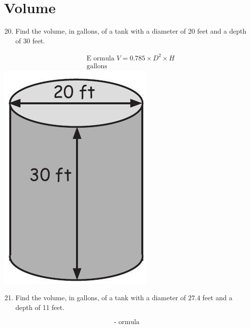 \documentclass[10pt]{article}
\begin{document}
\section{Volume}
\begin{enumerate}
  \setcounter{enumi}{19}
  \item Find the volume, in gallons, of a tank with a diameter of 20 feet and a depth of 30 feet.
\end{enumerate}
$$
\begin{aligned}
& \text { E ormula } V=0.785 \times D^{2} \times H \\
& \text { gallons }
\end{aligned}
$$
\includegraphics[max width=\textwidth]{2022_09_16_4d34b76b97ee13a67df7g-22}

\begin{enumerate}
  \setcounter{enumi}{20}
  \item Find the volume, in gallons, of a tank with a diameter of $27.4$ feet and a depth of 11 feet.
\end{enumerate}
$$
\text { - ormula }
$$
\end{document}
